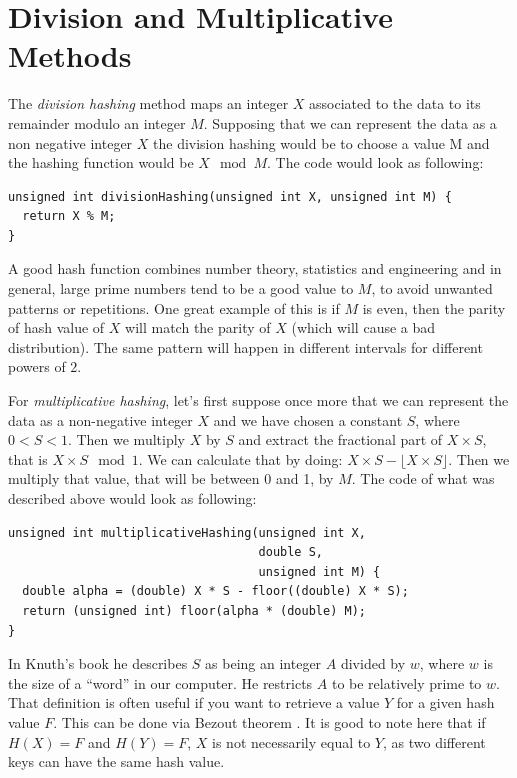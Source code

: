 \section{Division and Multiplicative Methods}

The \textit{division hashing} method maps an integer \( X \) associated to the data to its remainder modulo an integer \( M \). Supposing that we can represent the data as a non negative integer \( X \) the division hashing would be to choose a value M and the hashing function would be \( X \mod M \). The code would look as following:

\begin{lstlisting}
unsigned int divisionHashing(unsigned int X, unsigned int M) {
  return X % M;
}
\end{lstlisting}

A good hash function combines number theory, statistics and engineering and in general, large prime numbers tend to be a good value to \( M \), to avoid unwanted patterns or repetitions. One great example of this is if \( M \) is even, then the parity of hash value of \( X \) will match the parity of \( X \) (which will cause a bad distribution). The same pattern will happen in different intervals for different powers of \( 2 \).

For \textit{multiplicative hashing}, let's first suppose once more that we can represent the data as a non-negative integer \( X \) and we have chosen a constant \( S \), where \( 0 < S < 1 \). Then we multiply \( X \) by \( S \) and extract the fractional part of \( X \times S \), that is \( X \times S \mod  1 \). We can calculate that by doing: \( X \times S - \lfloor X \times S \rfloor \). Then we multiply that value, that will be between 0 and 1, by \( M \). The code of what was described above would look as following:

\medskip

\begin{lstlisting}
unsigned int multiplicativeHashing(unsigned int X,
                                   double S,
                                   unsigned int M) {
  double alpha = (double) X * S - floor((double) X * S);
  return (unsigned int) floor(alpha * (double) M);
}
\end{lstlisting}

In Knuth's book he describes \( S \) as being an integer \( A \) divided by \( w \), where \( w \) is the size of a ``word'' in our computer. He restricts \( A \) to be relatively prime to \( w \). That definition is often useful if you want to retrieve a value \( Y \) for a given hash value \( F \). This can be done via Bezout theorem \citep{TAOCP3}. It is good to note here that if \( H(X) = F \) and \( H(Y) = F \), \( X \) is not necessarily equal to \( Y \), as two different keys can have the same hash value.

